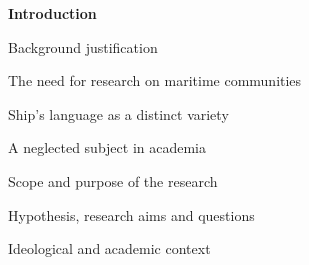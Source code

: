 \setcounter{listWWNumiileveli}{0}
\begin{listWWNumiileveli}
\item 
\begin{styleNormali}
\textbf{Introduction }
\end{styleNormali}

\end{listWWNumiileveli}
\setcounter{listWWNumiiileveli}{0}
\begin{listWWNumiiileveli}
\item 
\setcounter{listWWNumiiilevelii}{0}
\begin{listWWNumiiilevelii}
\item 
\begin{styleNormali}
Background justification 
\end{styleNormali}


\setcounter{listWWNumiiileveliii}{0}
\begin{listWWNumiiileveliii}
\item 
\begin{styleNormali}
The need for research on maritime communities
\end{styleNormali}

\item 
\begin{styleNormali}
Ship’s language as a distinct variety
\end{styleNormali}

\item 
\begin{styleNormali}
A neglected subject in academia 
\end{styleNormali}

\end{listWWNumiiileveliii}
\item 
\begin{styleNormali}
Scope and purpose of the research \ 
\end{styleNormali}


\setcounter{listWWNumiiileveliii}{0}
\begin{listWWNumiiileveliii}
\item 
\begin{styleNormali}
Hypothesis, research aims and questions 
\end{styleNormali}

\item 
\begin{styleNormali}
Ideological and academic context
\end{styleNormali}


\end{listWWNumiiileveliii}
\end{listWWNumiiilevelii}
\end{listWWNumiiileveli}
